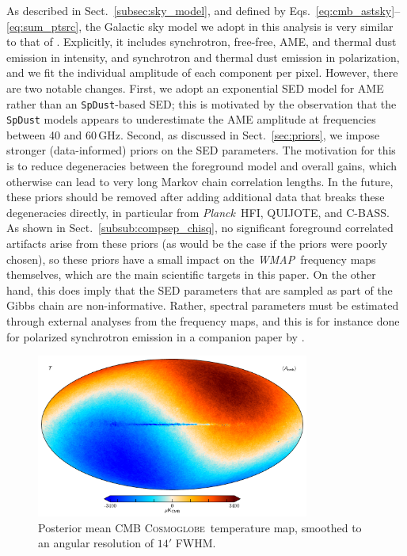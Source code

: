 \documentclass[twocolumn]{../../common/aa}
\def\WMAP{\emph{WMAP}}
\def\Planck{\emph{Planck}}
\newcommand{\cosmoglobe}{\textsc{Cosmoglobe}}
\begin{document}
As described in Sect.~\ref{subsec:sky_model}, and defined by Eqs.~\eqref{eq:cmb_astsky}--\eqref{eq:sum_ptsrc}, the Galactic sky model we adopt in this analysis is very similar to that of \citet{bp01}. Explicitly, it includes synchrotron, free-free, AME, and thermal dust emission in intensity, and synchrotron and thermal dust emission in polarization, and we fit the individual amplitude of each component per pixel. However, there are two notable changes. First, we adopt an exponential SED model for AME rather than an \texttt{SpDust}-based SED; this is motivated by the observation that the \texttt{SpDust} models appears to underestimate the AME amplitude at frequencies between 40 and 60\,GHz. Second, as discussed in Sect.~\ref{sec:priors}, we impose stronger (data-informed) priors on the SED parameters. The motivation for this is to reduce degeneracies between the foreground model and overall gains, which otherwise can lead to very long Markov chain correlation lengths. In the future, these priors should be removed after adding additional data that breaks these degeneracies directly, in particular from \Planck\ HFI, QUIJOTE, and C-BASS. As shown in Sect.~\ref{subsub:compsep_chisq}, no significant foreground correlated artifacts arise from these priors (as would be the case if the priors were poorly chosen), so these priors have a small impact on the \WMAP\ frequency maps themselves, which are the main scientific targets in this paper. On the other hand, this does imply that the SED parameters that are sampled as part of the Gibbs chain are non-informative. Rather, spectral parameters must be estimated through external analyses from the frequency maps, and this is for instance done for polarized synchrotron emission in a companion paper by \citet{fuskeland:2023}.

\begin{figure}
	\centering
	\includegraphics[width=0.8\textwidth]{figures/cmb_I_dipole.pdf}
	\caption{Posterior mean CMB \cosmoglobe\ temperature map, smoothed to an angular resolution of $14'$ FWHM.}
        \label{fig:cmb_mean}
\end{figure}
\end{document}
